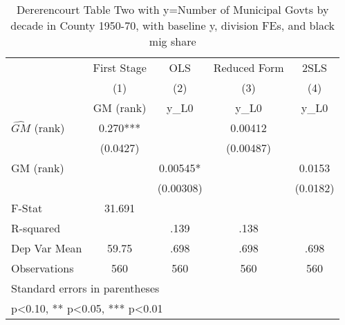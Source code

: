 \begin{table}[htbp]\centering
\def\sym#1{\ifmmode^{#1}\else\(^{#1}\)\fi}
\caption{Dererencourt Table Two with y=Number of Municipal Govts by decade in County 1950-70, with baseline y, division FEs, and black mig share}
\begin{tabular}{l*{4}{c}}
\toprule
                    & First Stage   &         OLS   &Reduced Form   &        2SLS   \\
                    &\multicolumn{1}{c}{(1)}&\multicolumn{1}{c}{(2)}&\multicolumn{1}{c}{(3)}&\multicolumn{1}{c}{(4)}\\
                    &\multicolumn{1}{c}{GM  (rank)}&\multicolumn{1}{c}{y\_L0}&\multicolumn{1}{c}{y\_L0}&\multicolumn{1}{c}{y\_L0}\\
\midrule
$\hat{GM}$ (rank)   &       0.270***&               &     0.00412   &               \\
                    &    (0.0427)   &               &   (0.00487)   &               \\
\addlinespace
GM  (rank)          &               &     0.00545*  &               &      0.0153   \\
                    &               &   (0.00308)   &               &    (0.0182)   \\
\midrule
F-Stat              &      31.691   &               &               &               \\
R-squared           &               &        .139   &        .138   &               \\
Dep Var Mean        &       59.75   &        .698   &        .698   &        .698   \\
Observations        &         560   &         560   &         560   &         560   \\
\bottomrule
\multicolumn{5}{l}{\footnotesize Standard errors in parentheses}\\
\multicolumn{5}{l}{\footnotesize * p<0.10, ** p<0.05, *** p<0.01}\\
\end{tabular}
\end{table}
